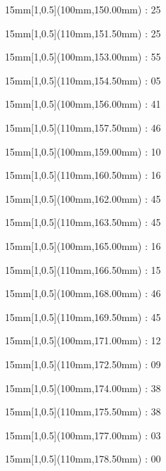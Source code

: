 \documentclass[a4paper]{memoir}
\begin{document}
\begin{textblock*}{15mm}[1,0.5](100mm,150.00mm) : 25\end{textblock*}
\begin{textblock*}{15mm}[1,0.5](110mm,151.50mm) : 25\end{textblock*}
\begin{textblock*}{15mm}[1,0.5](100mm,153.00mm) : 55\end{textblock*}
\begin{textblock*}{15mm}[1,0.5](110mm,154.50mm) : 05\end{textblock*}
\begin{textblock*}{15mm}[1,0.5](100mm,156.00mm) : 41\end{textblock*}
\begin{textblock*}{15mm}[1,0.5](110mm,157.50mm) : 46\end{textblock*}
\begin{textblock*}{15mm}[1,0.5](100mm,159.00mm) : 10\end{textblock*}
\begin{textblock*}{15mm}[1,0.5](110mm,160.50mm) : 16\end{textblock*}
\begin{textblock*}{15mm}[1,0.5](100mm,162.00mm) : 45\end{textblock*}
\begin{textblock*}{15mm}[1,0.5](110mm,163.50mm) : 45\end{textblock*}
\begin{textblock*}{15mm}[1,0.5](100mm,165.00mm) : 16\end{textblock*}
\begin{textblock*}{15mm}[1,0.5](110mm,166.50mm) : 15\end{textblock*}
\begin{textblock*}{15mm}[1,0.5](100mm,168.00mm) : 46\end{textblock*}
\begin{textblock*}{15mm}[1,0.5](110mm,169.50mm) : 45\end{textblock*}
\begin{textblock*}{15mm}[1,0.5](100mm,171.00mm) : 12\end{textblock*}
\begin{textblock*}{15mm}[1,0.5](110mm,172.50mm) : 09\end{textblock*}
\begin{textblock*}{15mm}[1,0.5](100mm,174.00mm) : 38\end{textblock*}
\begin{textblock*}{15mm}[1,0.5](110mm,175.50mm) : 38\end{textblock*}
\begin{textblock*}{15mm}[1,0.5](100mm,177.00mm) : 03\end{textblock*}
\begin{textblock*}{15mm}[1,0.5](110mm,178.50mm) : 00\end{textblock*}
\end{document}
